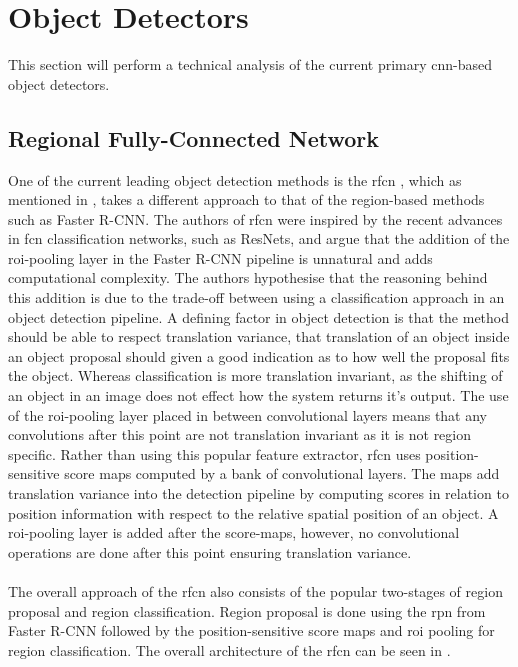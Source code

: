 \section{Object Detectors}
This section will perform a technical analysis of the current primary \gls{cnn}-based object detectors.


\subsection{Regional Fully-Connected Network}
One of the current leading object detection methods is the \gls{rfcn} \cite{rfcn}, which as mentioned in , takes a different approach to that of the region-based methods such as Faster R-CNN. The authors of \gls{rfcn} were inspired by the recent advances in \gls{fcn} classification networks, such as ResNets, and argue that the addition of the \gls{roi}-pooling layer in the Faster R-CNN pipeline is unnatural and adds computational complexity. The authors hypothesise that the reasoning behind this addition is due to the trade-off between using a classification approach in an object detection pipeline. A defining factor in object detection is that the method should be able to respect translation variance, that translation of an object inside an object proposal should given a good indication as to how well the proposal fits the object. Whereas classification is more translation invariant, as the shifting of an object in an image does not effect how the system returns it's output. The use of the \gls{roi}-pooling layer placed in between convolutional layers means that any convolutions after this point are not translation invariant as it is not region specific. Rather than using this popular feature extractor, \gls{rfcn} uses position-sensitive score maps computed by a bank of convolutional layers. The maps add translation variance into the detection pipeline by computing scores in relation to position information with respect to the relative spatial position of an object. A \gls{roi}-pooling layer is added after the score-maps, however, no convolutional operations are done after this point ensuring translation variance.
\\\\
The overall approach of the \gls{rfcn} also consists of the popular two-stages of region proposal and region classification. Region proposal is done using the \gls{rpn} from Faster R-CNN followed by the position-sensitive score maps and \gls{roi} pooling for region classification. The overall architecture of the \gls{rfcn} can be seen in .


